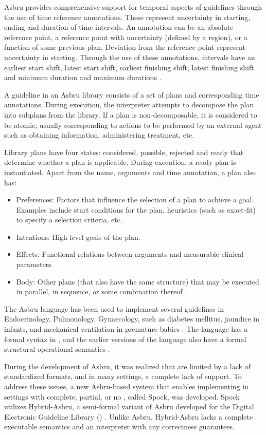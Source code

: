 Asbru provides comprehensive support for temporal aspects of guidelines through
the use of time reference annotations.
These represent uncertainty in starting, ending and duration
of time intervals. An annotation can be an absolute reference point,
a reference point with uncertainty (defined by a region), or a function of
some previous plan. Deviation from the reference point represent uncertainty
in starting. Through the use of these annotations, intervals have an
earliest start shift, latest start shift, earliest finishing shift, latest
finishing shift and minimum duration and maximum durations \cite{ShaharAIM98}.

A guideline in an Asbru library consists of a set
of plans and corresponding time annotations. During execution,
the interpreter attempts to decompose the plan into subplans from the library.
If a plan is non-decomposable, it is considered to be atomic, usually corresponding
to actions to be performed by an external agent such as obtaining information,
administering treatment, etc.

Library plans have four states: considered, possible, rejected and ready that
determine whether a plan is applicable. During execution, a ready plan is
instantiated. Apart from the name, arguments and time annotation, a plan also has:
\begin{itemize}
  \item Preferences: Factors that influence the selection of a plan to
    achieve a goal. Examples include start conditions for the plan,
    heuristics (such as exact-fit) to specify a selection criteria, etc.
  \item Intentions: High level goals of the plan.
  \item Effects: Functional relations between arguments and measurable
    clinical parameters.
  \item Body: Other plans (that also have the same structure) that may be
    executed in parallel, in sequence, or some combination thereof
    \cite{ShaharAIM98}.
\end{itemize}

The Asbru language has been used to implement several guidelines in
Endocrinology, Pulmonology, Gynaecology, such as diabetes mellitus, jaundice in
infants, and mechanical ventilation in premature babies
\cite{YoungAMIA05}. The language has a formal syntax in \BNF{}, and the earlier versions of the language
also have a formal structural operational semantics \cite{BalserPIDP02}.

During the development of Asbru, it was realized that
\CDSSs{} are limited by a lack of standardized \EHR{} formats, and in many
settings, a complete lack of \EHR{} support. To address these issues,
a new Asbru-based system that enables implementing \CDSSs{} in
settings with complete, partial, or no \EHR{}, called Spock, was developed.
Spock utilizes Hybrid-Asbru, a semi-formal variant of Asbru developed
for the Digital Electronic Guideline Library (\DEGEL{}) \cite{YoungAMIA05,YoungAIM05}.
Unlike Asbru, Hybrid-Asbru lacks a complete executable semantics and an
interpreter with any correctness guarantees.

